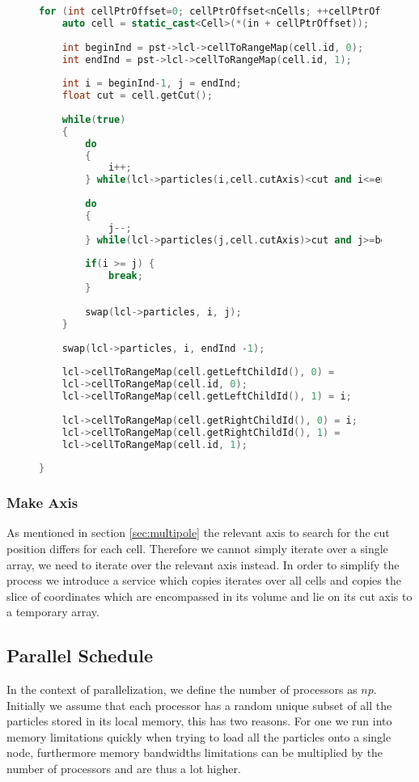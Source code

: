 \documentclass[]{article}
\begin{document}
\begin{figure}[H] 
	\begin{lstlisting}[language=c++, caption=Partition Service, label=partition]
for (int cellPtrOffset=0; cellPtrOffset<nCells; ++cellPtrOffset){
	auto cell = static_cast<Cell>(*(in + cellPtrOffset));
	
	int beginInd = pst->lcl->cellToRangeMap(cell.id, 0);
	int endInd = pst->lcl->cellToRangeMap(cell.id, 1);
	
	int i = beginInd-1, j = endInd;
	float cut = cell.getCut();
	
	while(true)
	{
		do
		{
			i++;
		} while(lcl->particles(i,cell.cutAxis)<cut and i<=endInd);
		
		do
		{
			j--;
		} while(lcl->particles(j,cell.cutAxis)>cut and j>=beginInd);
		
		if(i >= j) {
			break;
		}
		
		swap(lcl->particles, i, j);
	}
	
	swap(lcl->particles, i, endInd -1);
	
	lcl->cellToRangeMap(cell.getLeftChildId(), 0) =
	lcl->cellToRangeMap(cell.id, 0);
	lcl->cellToRangeMap(cell.getLeftChildId(), 1) = i;
	
	lcl->cellToRangeMap(cell.getRightChildId(), 0) = i;
	lcl->cellToRangeMap(cell.getRightChildId(), 1) =
	lcl->cellToRangeMap(cell.id, 1);
	
}
	\end{lstlisting}
\end{figure}


\subsubsection{Make Axis}

As mentioned in section \ref{sec:multipole} the relevant axis to search for the cut position differs for each cell. Therefore we cannot simply iterate over a single array, we need to iterate over the relevant axis instead. In order to simplify the process we introduce a service which copies iterates over all cells and copies the slice of coordinates which are encompassed in its volume and lie on its cut axis to a temporary array.



\subsection{Parallel Schedule}\label{sec:parellize-orb}

In the context of parallelization, we define the number of processors as $np$. 
Initially we assume that each processor has a random unique subset of all the particles stored in its local memory, this has two reasons. For one we run into memory limitations quickly when trying to load all the particles onto a single node, furthermore memory bandwidths limitations can be multiplied by the number of processors and are thus a lot higher. 
\end{document}

